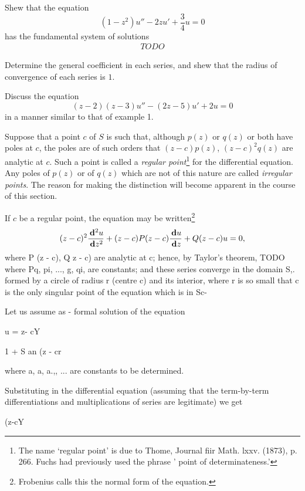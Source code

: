 \begin{wandwexample}
Shew that the equation
$$
(1 - z^{2}) u'' - 2 z u' + \frac{3}{4} u = 0
$$
has the fundamental system of solutions
\begin{align*}
  TODO
\end{align*}

Determine the general coefficient in each series, and shew that the
radius of convergence of each series is $1$.
\end{wandwexample}
\begin{wandwexample}
Discuss the equation
$$
(z-2)(z-3) u'' - (2z-5) u' + 2u = 0
$$
in a manner similar to that of example 1.
\end{wandwexample}
%
Suppose that a point $c$ of $S$ is such that, although $p(z)$ or $q(z)$ or
both have poles at $c$, the poles are of such orders that
$(z - c) p(z)$, $(z- c)^{2} q(z)$ are analytic at $c$.
Such a point is called a \emph{regular point}\footnote{The name
  `regular point' is due to
  Thome, Journal fiir Math. lxxv. (1873), p. 266. %
  Fuchs had previously used the phrase ' point of determinateness.'}
for the differential equation. Any poles of $p(z)$ or of $q(z)$ which are
not of this nature are called \emph{irregular points}. The reason for making
the distinction will become apparent in the course of this section.

If $c$ be a regular point, the equation may be written\footnote{Frobenius
  calls this the normal form of the equation.}
$$
(z-c)^{2} \frac{\, \mathbf{d}^{2} u}{\, \mathbf{d} z^{2}}
+ (z-c) P(z-c) \frac{\, \mathbf{d} u}{\, \mathbf{d} z}
+ Q(z-c) u = 0,
$$
where P (z - c), Q z - c) are analytic at c; hence, by Taylor's
theorem,
TODO
where Pq, pi, ..., g, qi,  are constants; and these series
converge in the domain S,. formed by a circle of radius r (centre c)
and its interior, where r is so small that c is the only singular
point of the equation which is in Sc-

Let us assume as - formal solution of the equation

u = z- cY

1 + S an (z - cr

where a, a, a.,, ... are constants to be determined.

%
%

Substituting in the differential equation (assuming that the
term-by-term differentiations and multiplications of series are
legitimate) we get

(z-cY

